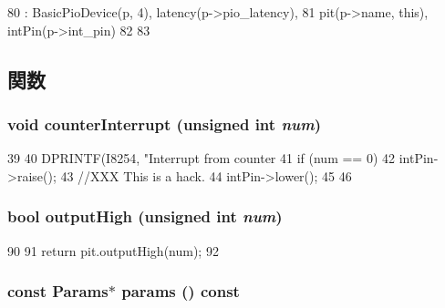 \begin{DoxyCode}
80                      : BasicPioDevice(p, 4), latency(p->pio_latency),
81             pit(p->name, this), intPin(p->int_pin)
82     {
83     }
\end{DoxyCode}


\subsection{関数}
\hypertarget{classX86ISA_1_1I8254_abe266c027cb8a03b2e1e2f08d9398679}{
\subsubsection[{counterInterrupt}]{\setlength{\rightskip}{0pt plus 5cm}void counterInterrupt (unsigned int {\em num})}}
\label{classX86ISA_1_1I8254_abe266c027cb8a03b2e1e2f08d9398679}



\begin{DoxyCode}
39 {
40     DPRINTF(I8254, "Interrupt from counter %
41     if (num == 0) {
42         intPin->raise();
43         //XXX This is a hack.
44         intPin->lower();
45     }
46 }
\end{DoxyCode}
\hypertarget{classX86ISA_1_1I8254_ab3ebc39ad58dd927f9da6958c45203a2}{
\subsubsection[{outputHigh}]{\setlength{\rightskip}{0pt plus 5cm}bool outputHigh (unsigned int {\em num})}}
\label{classX86ISA_1_1I8254_ab3ebc39ad58dd927f9da6958c45203a2}



\begin{DoxyCode}
90     {
91         return pit.outputHigh(num);
92     }
\end{DoxyCode}
\hypertarget{classX86ISA_1_1I8254_acd3c3feb78ae7a8f88fe0f110a718dff}{
\subsubsection[{params}]{\setlength{\rightskip}{0pt plus 5cm}const {\bf Params}$\ast$ params () const}}
\label{classX86ISA_1_1I8254_acd3c3feb78ae7a8f88fe0f110a718dff}


